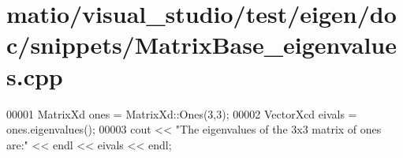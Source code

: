\hypertarget{matio_2visual__studio_2test_2eigen_2doc_2snippets_2_matrix_base__eigenvalues_8cpp_source}{}\section{matio/visual\+\_\+studio/test/eigen/doc/snippets/\+Matrix\+Base\+\_\+eigenvalues.cpp}
\label{matio_2visual__studio_2test_2eigen_2doc_2snippets_2_matrix_base__eigenvalues_8cpp_source}

\begin{DoxyCode}
00001 MatrixXd ones = MatrixXd::Ones(3,3);
00002 VectorXcd eivals = ones.eigenvalues();
00003 cout << \textcolor{stringliteral}{"The eigenvalues of the 3x3 matrix of ones are:"} << endl << eivals << endl;
\end{DoxyCode}
